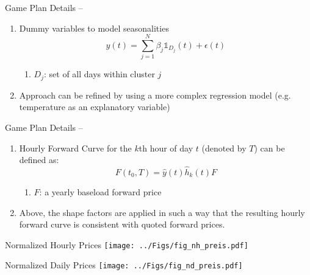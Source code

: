 \documentclass{beamer}
\begin{document}
\begin{frame}{Game Plan Details -- \cite{BurgerGraeberSchindlmayr-2014}}
    \begin{enumerate}[label=$\bullet$, itemsep=0.1cm]
        \item Dummy variables to model seasonalities
              \[
                  y(t)
                  = \sum_{j = 1}^N \beta_j \mathds{1}_{D_j}(t) + \epsilon(t)
              \]
              \begin{enumerate}
                  \item $D_j$: set of all days within cluster $j$
              \end{enumerate}

        \item Approach can be refined by using a more complex regression model (e.g. temperature as an explanatory variable)
    \end{enumerate}
\end{frame}


\begin{frame}{Game Plan Details -- \cite{BurgerGraeberSchindlmayr-2014}}
    \begin{enumerate}[label=--]
        \item Hourly Forward Curve for the $k$th hour of day $t$ (denoted by $T$) can be defined as:
              \[
                  F(t_0, T) = \hat y(t) \hat h_k(t) F
              \]
              \begin{enumerate}[label=$\bullet$]
                  \item $F$: a yearly baseload forward price
              \end{enumerate}

        \item Above, the shape factors are applied in such a way that the resulting hourly forward curve is consistent with quoted forward prices.
    \end{enumerate}
\end{frame}


\begin{frame}{Normalized Hourly Prices}
    \texttt{[image: ../Figs/fig\_nh\_preis.pdf]}
\end{frame}


\begin{frame}{Normalized Daily Prices}
    \texttt{[image: ../Figs/fig\_nd\_preis.pdf]}
\end{frame}


\end{document}
